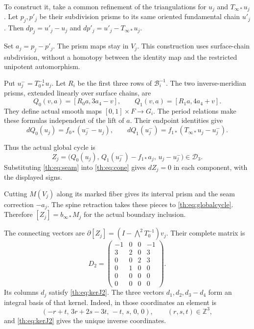 To construct it, take a common refinement of the triangulations for $u_j$
and $T_{\infty*}u_j$.
Let $p_j,p'_j$ be their subdivision prisms to its same oriented fundamental chain $u'_j$.
Then $dp_j=u'_j-u_j$ and $dp'_j=u'_j-T_{\infty*}u_j$.

Set $a_j=p_j-p'_j$.
The prism maps stay in $V_j$.
This construction uses surface-chain subdivision, without a homotopy between
the identity map and the restricted unipotent automorphism.

Put $u_j^-=T_{0*}^{-1}u_j$.
Let $R_i$ be the first three rows of $\mathcal B_i^{-1}$.
The two inverse-meridian prisms, extended linearly over surface chains, are
\begin{equation}\label{th:eq:prisms}
Q_0(v,a)=[R_0a,3a_4-v],\qquad
Q_1(v,a)=[R_1a,4a_4+v].
\end{equation}
They define actual smooth maps $[0,1]\times F\to G_i$.
The period relations make these formulas independent of the lift of $a$.
Their endpoint identities give
\[
dQ_0(u_j)=f_{0*}(u_j^--u_j),\qquad
dQ_1(u_j^-)=f_{1*}(T_{\infty*}u_j-u_j^-).
\]

Thus the actual global cycle is
\begin{equation}\label{th:eq:globalcycle}
Z_j=\bigl(Q_0(u_j),\,Q_1(u_j^-)-f_{1*}a_j,\,u_j-u_j^-\bigr)
\in\mathcal D_3.
\end{equation}
Substituting \eqref{th:eq:seam} into \eqref{th:eq:cone} gives $dZ_j=0$
in each component, with the displayed signs.

Cutting $M(V_j)$ along its marked fiber gives its interval prism and the seam correction $-a_j$.
The spine retraction takes these pieces to \eqref{th:eq:globalcycle}.
Therefore $[Z_j]=b_{\infty*}M_j$ for the actual boundary inclusion.

The connecting vectors are
$\partial[Z_j]=(I-\bigwedge^2T_0^{-1})v_j$.
Their complete matrix is
\begin{equation}\label{th:eq:D}
D_2=
\begin{pmatrix}
-1&0&0&-1\\3&2&0&3\\0&0&2&3\\
0&1&0&0\\0&0&0&0\\0&0&0&0
\end{pmatrix}.
\end{equation}
Its columns $d_j$ satisfy \eqref{th:eq:kerJ2}.
The three vectors $d_1,d_2,d_3-d_4$ form an integral basis of that kernel.
Indeed, in those coordinates an element is
\[
(-r+t,\,3r+2s-3t,\,-t,\,s,\,0,\,0),
\qquad (r,s,t)\in\mathbb Z^3,
\]
and \eqref{th:eq:kerJ2} gives the unique inverse coordinates.

